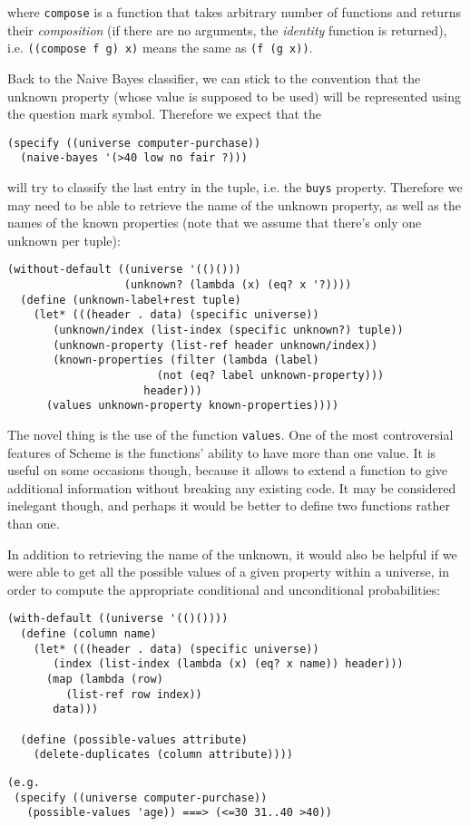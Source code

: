 where \texttt{compose} is a function that takes arbitrary
number of functions and returns their \textit{composition}
(if there are no arguments, the \textit{identity} function
is returned), i.e. \texttt{((compose f g) x)} means the
same as \texttt{(f (g x))}.

Back to the Naive Bayes classifier, we can stick to
the convention that the unknown property (whose value
is supposed to be used) will be represented using the
question mark symbol. Therefore we expect that the

\begin{Verbatim}[samepage=true]
(specify ((universe computer-purchase))
  (naive-bayes '(>40 low no fair ?)))
\end{Verbatim}

will try to classify the last entry in the tuple, i.e.
the \texttt{buys} property. Therefore we may need to be able
to retrieve the name of the unknown property, as well
as the names of the known properties (note that we assume
that there's only one unknown per tuple):

\begin{Verbatim}[samepage=true]
(without-default ((universe '(()()))
                  (unknown? (lambda (x) (eq? x '?))))
  (define (unknown-label+rest tuple)
    (let* (((header . data) (specific universe))
	   (unknown/index (list-index (specific unknown?) tuple))
	   (unknown-property (list-ref header unknown/index))
	   (known-properties (filter (lambda (label)
				       (not (eq? label unknown-property)))
				     header)))
      (values unknown-property known-properties))))
\end{Verbatim}

The novel thing is the use of the function \texttt{values}.
One of the most controversial features of Scheme is the functions'
ability to have more than one value. It is useful on some
occasions though, because it allows to extend a function
to give additional information without breaking any existing
code. It may be considered inelegant though, and perhaps
it would be better to define two functions rather than one.


In addition to retrieving the name of the unknown, it would 
also be helpful if we were able to get all the possible values
of a given property within a universe, in order to compute
the appropriate conditional and unconditional probabilities:

\begin{Verbatim}[samepage=true]
(with-default ((universe '(()())))
  (define (column name)
    (let* (((header . data) (specific universe))
	   (index (list-index (lambda (x) (eq? x name)) header)))
      (map (lambda (row)
	     (list-ref row index))
	   data)))

  (define (possible-values attribute)
    (delete-duplicates (column attribute))))
\end{Verbatim}
\begin{Verbatim}[samepage=true]
(e.g.
 (specify ((universe computer-purchase))
   (possible-values 'age)) ===> (<=30 31..40 >40))
\end{Verbatim}

